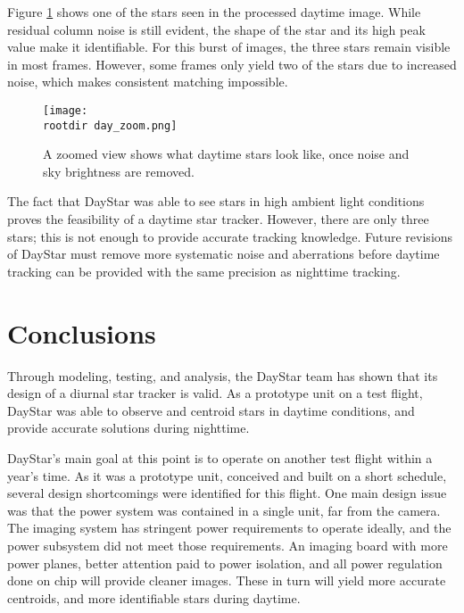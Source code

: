 \documentclass[twocolumn,letterpaper]{IEEEAerospace2012}
\newcommand{\rootdir}{./Figures/}
\begin{document}
Figure \ref{fig:day_zoom} shows one of the stars seen in the processed daytime image. While residual column noise is still evident, the shape of the star and its high peak value make it identifiable. For this burst of images, the three stars remain visible in most frames. However, some frames only yield two of the stars due to increased noise, which makes consistent matching impossible. 

\begin{figure}[H]
    \centering
    \texttt{[image: \\rootdir day\_zoom.png]}
    \caption{A zoomed view shows what daytime stars look like, once noise and sky brightness are removed.}
    \label{fig:day_zoom}
\end{figure}

The fact that DayStar was able to see stars in high ambient light conditions proves the feasibility of a daytime star tracker. However, there are only three stars; this is not enough to provide accurate tracking knowledge. Future revisions of DayStar must remove more systematic noise and aberrations before daytime tracking can be provided with the same precision as nighttime tracking.


\section{Conclusions}
Through modeling, testing, and analysis, the DayStar team has shown that its design of a diurnal star tracker is valid. As a prototype unit on a test flight, DayStar was able to observe and centroid stars in daytime conditions, and provide accurate solutions during nighttime.

DayStar's main goal at this point is to operate on another test flight within a year's time. As it was a prototype unit, conceived and built on a short schedule, several design shortcomings were identified for this flight. One main design issue was that the power system was contained in a single unit, far from the camera. The imaging system has stringent power requirements to operate ideally, and the power subsystem did not meet those requirements. An imaging board with more power planes, better attention paid to power isolation, and all power regulation done on chip will provide cleaner images. These in turn will yield more accurate centroids, and more identifiable stars during daytime.
\end{document}
